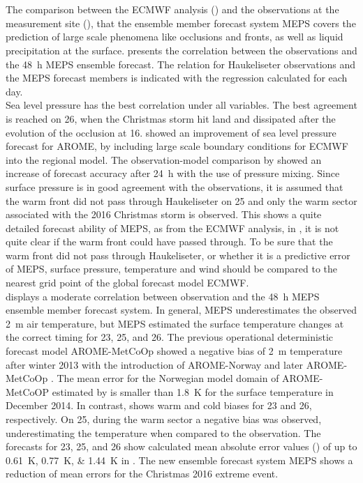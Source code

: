 \\
\\
The comparison between the ECMWF analysis () and the observations at the measurement site (), that the ensemble member forecast system MEPS covers the prediction of large scale phenomena like occlusions and fronts, as well as liquid precipitation at the surface.  presents the correlation between the observations and the \SI{48}{\hour} MEPS ensemble forecast. The relation for Haukeliseter observations and the MEPS forecast members is indicated with the regression calculated for each day.
\\
Sea level pressure has the best correlation under all variables. The best agreement is reached on \SI{26}{\dec}, when the Christmas storm hit land and dissipated after the evolution of the occlusion at \SI{16}{\UTC}. \citet{dahlgren_comparison_2013} showed an improvement of sea level pressure forecast for AROME, by including large scale boundary conditions for ECMWF into the regional model. The observation-model comparison by \citet{dahlgren_comparison_2013} showed an increase of forecast accuracy after \SI{24}{\hour} with the use of pressure mixing. 
Since surface pressure is in good agreement with the observations, it is assumed that the warm front did not pass through Haukeliseter on \SI{25}{\dec} and only the warm sector associated with the 2016 Christmas storm is observed. This shows a quite detailed forecast ability of MEPS, as from the ECMWF analysis, in , it is not quite clear if the warm front could have passed through. To be sure that the warm front did not pass through Haukeliseter, or whether it is a predictive error of MEPS, surface pressure, temperature and wind should be compared to the nearest grid point of the global forecast model ECMWF.
\\
 displays a moderate correlation between observation and the \SI{48}{\hour} MEPS ensemble member forecast system. In general, MEPS underestimates the observed \SI{2}{\metre} air temperature, but MEPS estimated the surface temperature changes at the correct timing for \num{23}, \num{25}, and \SI{26}{\dec}. The previous operational deterministic forecast model AROME-MetCoOp showed a negative bias of \SI{2}{\metre} temperature after winter 2013 with the introduction of AROME-Norway and later AROME-MetCoOp \citep{muller_arome-metcoop:_2017}. 
The mean error for the Norwegian model domain of AROME-MetCoOP estimated by \citet{muller_arome-metcoop:_2017} is smaller than \SI{1.8}{\kelvin} for the surface temperature in December 2014. In contrast,  shows warm and cold biases for \num{23} and \SI{26}{\dec}, respectively. On \SI{25}{\dec}, during the warm sector a negative bias was observed, underestimating the temperature when compared to the observation.  The forecasts for \num{23}, \num{25}, and \SI{26}{\dec} show calculated mean absolute error values () of up to \SIlist{0.61;0.77;1.44}{\kelvin} in . The new ensemble forecast system MEPS shows a reduction of mean errors for the Christmas 2016 extreme event. 
